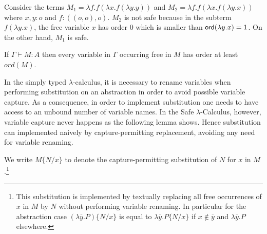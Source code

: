 \documentclass{llncs}
\newcommand\captsubst[2]{\{#1/#2 \}}
\newcommand\dps{\displaystyle}
\newcommand\rulef[2]{\frac{\dps #1}{\dps #2}}
\newcommand\ord[1]{{\sf ord}(#1)}
\begin{document}
\begin{example}
\label{ex:kierstead}
Consider the terms $M_1 = \lambda f . f (\lambda x . f (\lambda y . y ))$ and
$M_2 = \lambda f . f (\lambda x . f (\lambda y .x ))$ where $x,y:o$ and $f:((o,o),o)$.
$M_2$ is not safe because in the subterm $f (\lambda y . x)$, the free variable $x$ has order $0$ which is smaller than $\ord{\lambda y . x} = 1$.
On the other hand, $M_1$ is safe.
\end{example}

\begin{lemma}
\label{lem:ordfreevar}
If $\Gamma \vdash M : A$ then every variable in $\Gamma$ occurring free in $M$ has order at least $ord(M)$.
\end{lemma}




In the simply typed $\lambda$-calculus, it is necessary to rename
variables when performing substitution on an abstraction in order to
avoid possible variable capture. As a consequence, in order to
implement substitution one needs to have access to an unbound number
of variable names.
In the Safe $\lambda$-Calculus, however, variable capture never happens as the following lemma shows.
Hence substitution can implemented naively by capture-permitting replacement, avoiding any need for variable renaming.


We write $M\captsubst{N}{x}$ to denote the capture-permitting substitution of $N$ for $x$ in $M$.\footnote{This substitution is implemented
by textually replacing all free occurrences of $x$ in $M$ by $N$ without performing variable renaming.
In particular for the abstraction case
$(\lambda \overline{y} . P)\captsubst{N}{x}$ is
equal to $\lambda \overline{y} . P\captsubst{N}{x}$ if $x\not\in \overline{y}$ and $\lambda \overline{y} . P$ elsewhere.}
\end{document}
